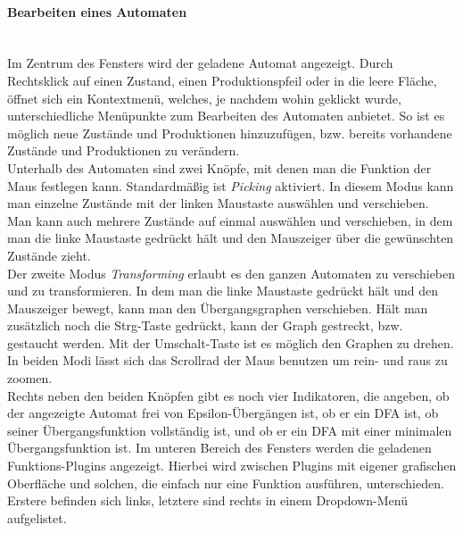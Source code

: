 \paragraph{Bearbeiten eines Automaten}\ \\
Im Zentrum des Fensters wird der geladene Automat angezeigt. Durch Rechtsklick auf einen Zustand, einen Produktionspfeil oder in die leere Fläche, öffnet sich ein Kontextmenü, welches, je nachdem wohin geklickt wurde, unterschiedliche Menüpunkte zum Bearbeiten des Automaten anbietet. So ist es möglich neue Zustände und Produktionen hinzuzufügen, bzw. bereits vorhandene Zustände und Produktionen zu verändern.\\
Unterhalb des Automaten sind zwei Knöpfe, mit denen man die Funktion der Maus festlegen kann. Standardmäßig ist \textit{Picking} aktiviert. In diesem Modus kann man einzelne Zustände mit der linken Maustaste auswählen und verschieben. Man kann auch mehrere Zustände auf einmal auswählen und verschieben, in dem man die linke Maustaste gedrückt hält und den Mauszeiger über die gewünschten Zustände zieht.\\
Der zweite Modus \textit{Transforming} erlaubt es den ganzen Automaten zu verschieben und zu transformieren. In dem man die linke Maustaste gedrückt hält und den Mauszeiger bewegt, kann man den Übergangsgraphen verschieben. Hält man zusätzlich noch die Strg-Taste gedrückt, kann der Graph gestreckt, bzw. gestaucht werden. Mit der Umschalt-Taste ist es möglich den Graphen zu drehen.\\
In beiden Modi lässt sich das Scrollrad der Maus benutzen um rein- und raus zu zoomen.\\
Rechts neben den beiden Knöpfen gibt es noch vier Indikatoren, die angeben, ob der angezeigte Automat frei von Epsilon-Übergängen ist, ob er ein DFA ist, ob seiner Übergangsfunktion vollständig ist, und ob er ein DFA mit einer minimalen Übergangsfunktion ist.
Im unteren Bereich des Fensters werden die geladenen Funktions-Plugins angezeigt. Hierbei wird zwischen Plugins mit eigener grafischen Oberfläche und solchen, die einfach nur eine Funktion ausführen, unterschieden. Erstere befinden sich links, letztere sind rechts in einem Dropdown-Menü aufgelistet.
